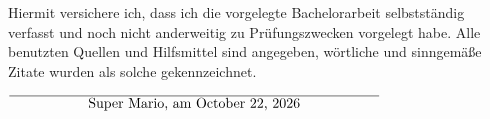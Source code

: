 \documentclass[12pt,oneside,a4paper,parskip]{scrbook}
\def\BaAuthor{Super Mario}
\begin{document}
\newpage
{}
{}
\printbibliography		



Hiermit versichere ich, dass ich die vorgelegte Bachelorarbeit selbstständig verfasst und noch nicht anderweitig zu Prüfungszwecken vorgelegt habe. Alle benutzten Quellen und Hilfsmittel sind angegeben, wörtliche und sinngemäße Zitate wurden als solche gekennzeichnet.

\vspace{20pt}
\begin{flushright}
$\overline{~~~~~~~~~~~~~~~~~\mbox{\BaAuthor, am \today}~~~~~~~~~~~~~~~~~}$
\end{flushright}
\end{document}
